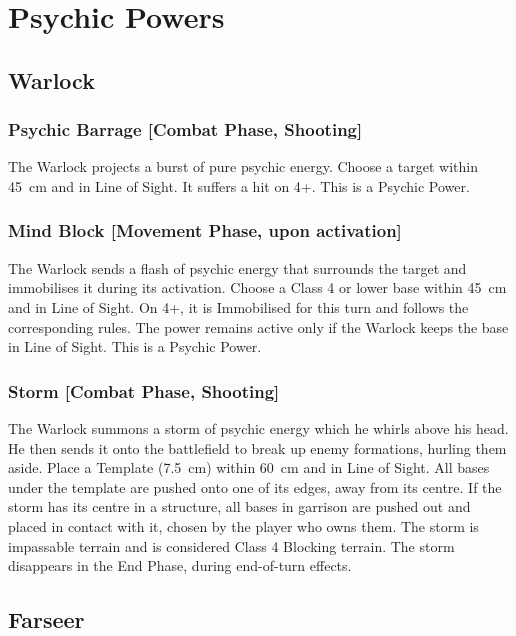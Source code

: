 \section{Psychic Powers}

\subsection{Warlock}

\subsubsection{Psychic Barrage [Combat Phase, Shooting]}

The Warlock projects a burst of pure psychic energy. Choose a target within 45~cm and in Line of Sight. It suffers a hit on 4+. This is a Psychic Power.

\subsubsection{Mind Block [Movement Phase, upon activation]}

The Warlock sends a flash of psychic energy that surrounds the target and immobilises it during its activation. Choose a Class 4 or lower base within 45~cm and in Line of Sight. On 4+, it is Immobilised for this turn and follows the corresponding rules. The power remains active only if the Warlock keeps the base in Line of Sight. This is a Psychic Power.

\subsubsection{Storm [Combat Phase, Shooting]}

The Warlock summons a storm of psychic energy which he whirls above his head. He then sends it onto the battlefield to break up enemy formations, hurling them aside. Place a Template (7.5~cm) within 60~cm and in Line of Sight. All bases under the template are pushed onto one of its edges, away from its centre. If the storm has its centre in a structure, all bases in garrison are pushed out and placed in contact with it, chosen by the player who owns them. The storm is impassable terrain and is considered Class 4 Blocking terrain. The storm disappears in the End Phase, during end-of-turn effects.

\subsection{Farseer}

